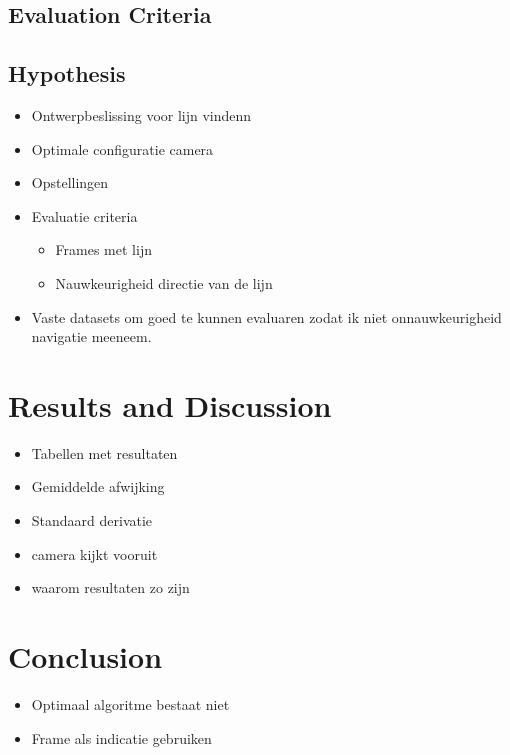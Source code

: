 \documentclass[a4paper]{article}
\begin{document}
\subsection{Evaluation Criteria}

\subsection{Hypothesis}
\begin{itemize}
\item Ontwerpbeslissing voor lijn vindenn
\item Optimale configuratie camera
\item Opstellingen
\item Evaluatie criteria
\begin{itemize}
\item Frames met lijn
\item Nauwkeurigheid directie van de lijn
\end{itemize}
\item Vaste datasets om goed te kunnen evaluaren zodat ik niet onnauwkeurigheid navigatie meeneem.
\end{itemize}

\newpage 
\section{Results and Discussion}
\label{RESULTS_DISCUSSION}
\begin{itemize}
\item Tabellen met resultaten
\item Gemiddelde afwijking
\item Standaard derivatie
\end{itemize}
\begin{itemize}
\item camera kijkt vooruit
\item waarom resultaten zo zijn
\end{itemize}

\newpage
\section{Conclusion}
\label{CONCLUSION}
\begin{itemize}
\item Optimaal algoritme bestaat niet
\item Frame als indicatie gebruiken
\end{itemize}
\end{document}
